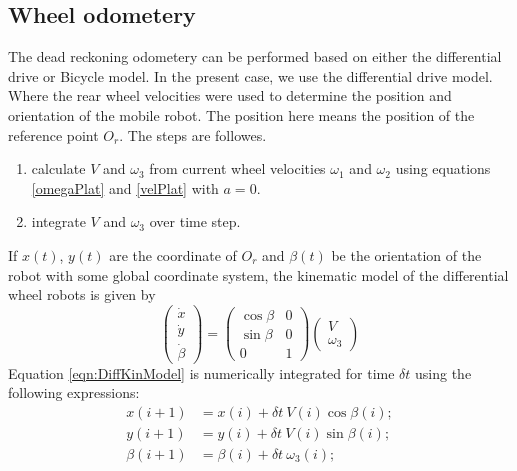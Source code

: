  

\subsection{Wheel odometery }
The dead reckoning odometery can be performed based on either the differential drive or Bicycle model. In the present case, we use the differential drive model. Where the rear wheel velocities were used to determine the position and orientation of the mobile robot. The position here means the position of the reference point $O_r$. The steps are followes.
\begin{enumerate}
	\item calculate $V$ and $\omega_3$ from current wheel velocities $\omega_1$  and  $\omega_2$  using equations \ref{omegaPlat} and \ref{velPlat} with $a=0$.
	\item integrate $V$ and $\omega_3$ over time step.
\end{enumerate}
If $x(t)$, $y(t)$ are the coordinate of $O_r$  and  $\beta(t)$ be the orientation of the robot with some global coordinate system, the kinematic model of the differential wheel robots is given by \cite{campion1996structural}  
\begin{equation}
\label{eqn:DiffKinModel}
\begin{pmatrix}
\dot{x}\\\dot{y}\\\dot{\beta}
\end{pmatrix}=
\begin{pmatrix}
\cos\beta & 0\\
\sin\beta & 0\\
0&1
\end{pmatrix}
\begin{pmatrix}
V\\\omega_3
\end{pmatrix}
\end{equation}
Equation \ref{eqn:DiffKinModel} is numerically integrated for time $\delta t$ using the following expressions:
\begin{align}
\label{eqn:odo1}
 x(i+1)&=x(i)+\delta t~ V(i)\cos\beta(i);\\
 \label{eqn:odo2}
y(i+1)&=y(i)+\delta t~V(i)\sin\beta(i);\\
\label{eqn:odo3}
\beta(i+1)&=\beta(i)+\delta t~\omega_3(i);
\end{align}
